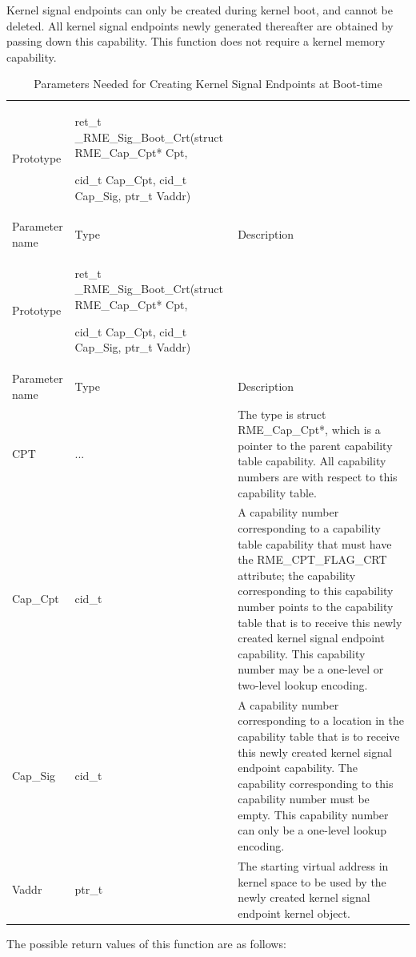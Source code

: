 Kernel signal endpoints can only be created during kernel boot, and cannot be deleted. All kernel signal endpoints newly generated thereafter are obtained by passing down this capability. This function does not require a kernel memory capability.

\begin{xltabular}{\textwidth}{@{}>{\hsize\raggedright\arraybackslash}X>{\hsize\raggedright\arraybackslash}X>{\hsize\raggedright\arraybackslash}X@{}}
\caption{Parameters Needed for Creating Kernel Signal Endpoints at Boot-time}\label{tab:7-57-create-kernel-signal-endpoint-at-boot-parameters}\\
\toprule
Prototype\strut
 & ret\_t \_RME\_Sig\_Boot\_Crt(struct RME\_Cap\_Cpt* Cpt,

cid\_t Cap\_Cpt, cid\_t Cap\_Sig, ptr\_t Vaddr)\strut
 & \strut
\tabularnewline
Parameter name & Type & Description\tabularnewline
\endfirsthead
\toprule
Prototype\strut
 & ret\_t \_RME\_Sig\_Boot\_Crt(struct RME\_Cap\_Cpt* Cpt,

cid\_t Cap\_Cpt, cid\_t Cap\_Sig, ptr\_t Vaddr)\strut
 & \strut
\tabularnewline
Parameter name & Type & Description\tabularnewline
\midrule
\endhead
\bottomrule
\endlastfoot
CPT & ... &
The type is struct RME\_Cap\_Cpt*, which is a pointer to the parent capability table capability. All capability numbers are with respect to this capability table.\tabularnewline
Cap\_Cpt & cid\_t &
A capability number corresponding to a capability table capability that must have the RME\_CPT\_FLAG\_CRT attribute; the capability corresponding to this capability number points to the capability table that is to receive this newly created kernel signal endpoint capability. This capability number may be a one-level or two-level lookup encoding.\tabularnewline
Cap\_Sig & cid\_t &
A capability number corresponding to a location in the capability table that is to receive this newly created kernel signal endpoint capability. The capability corresponding to this capability number must be empty. This capability number can only be a one-level lookup encoding.\tabularnewline
Vaddr & ptr\_t &
The starting virtual address in kernel space to be used by the newly created kernel signal endpoint kernel object.\tabularnewline
\end{xltabular}
\nopagebreak[4]

The possible return values of this function are as follows:

